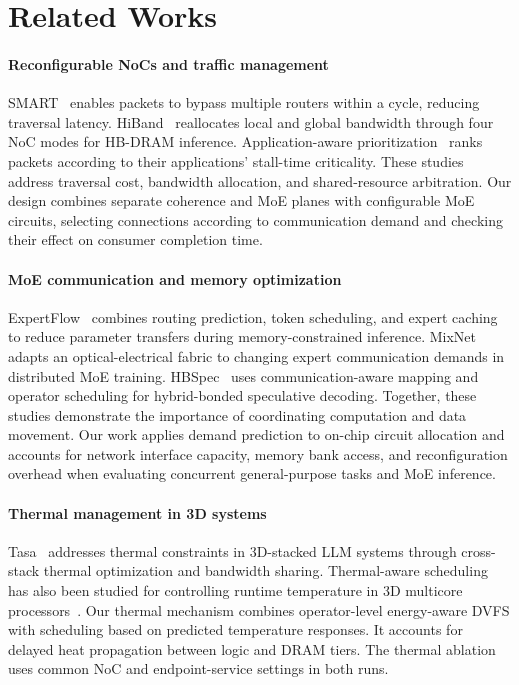 \documentclass[conference,10pt]{IEEEtran}
\begin{document}
\FloatBarrier

\section{Related Works}
\label{sec:related-works}

\paragraph{Reconfigurable NoCs and traffic management}
SMART~\cite{krishna2013smart} enables packets to bypass multiple routers
within a cycle, reducing traversal latency. HiBand~\cite{wang2026hiband}
reallocates local and global bandwidth through four NoC modes for
HB-DRAM inference. Application-aware prioritization~\cite{das2009priority}
ranks packets according to their applications' stall-time criticality.
These studies address traversal cost, bandwidth allocation, and
shared-resource arbitration. Our design combines separate coherence and
MoE planes with configurable MoE circuits, selecting connections according
to communication demand and checking their effect on consumer completion time.

\paragraph{MoE communication and memory optimization}
ExpertFlow~\cite{he2026expertflow} combines routing prediction, token
scheduling, and expert caching to reduce parameter transfers during
memory-constrained inference. MixNet~\cite{liao2025mixnet} adapts an
optical-electrical fabric to changing expert communication demands in
distributed MoE training. HBSpec~\cite{wang2026hbspec} uses
communication-aware mapping and operator scheduling for hybrid-bonded
speculative decoding. Together, these studies demonstrate the importance
of coordinating computation and data movement. Our work applies demand
prediction to on-chip circuit allocation and accounts for network interface
capacity, memory bank access, and reconfiguration overhead when evaluating
concurrent general-purpose tasks and MoE inference.

\paragraph{Thermal management in 3D systems}
Tasa~\cite{he2025tasa} addresses thermal constraints in 3D-stacked LLM
systems through cross-stack thermal optimization and bandwidth sharing.
Thermal-aware scheduling has also been studied for controlling runtime
temperature in 3D multicore processors~\cite{tsai2016thermal}.
Our thermal mechanism combines operator-level energy-aware DVFS with
scheduling based on predicted temperature responses. It accounts for
delayed heat propagation between logic and DRAM tiers. The thermal
ablation uses common NoC and endpoint-service settings in both runs.
\end{document}
